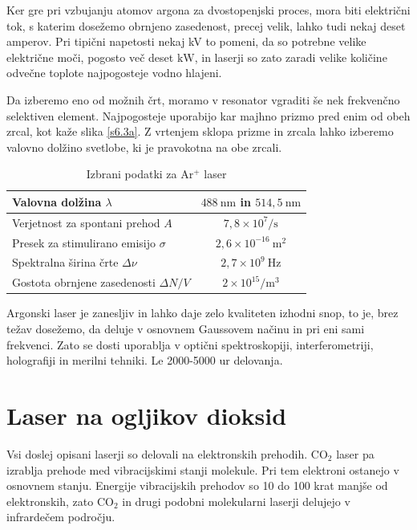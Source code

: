 Ker gre pri vzbujanju atomov argona za dvostopenjski proces, mora biti električni tok, 
s katerim dosežemo obrnjeno zasedenost, precej velik, lahko tudi nekaj deset amperov. 
Pri tipični napetosti nekaj kV to pomeni,
da so potrebne velike električne moči, pogosto več deset $\si{\kilo\watt}$, in 
laserji so zato zaradi velike količine odvečne toplote najpogosteje vodno hlajeni.





Da izberemo eno od možnih črt, moramo v resonator vgraditi še nek
frekvenčno selektiven element. Najpogosteje uporabijo kar majhno prizmo
pred enim od obeh zrcal, kot kaže slika \ref{s6.3a}. Z vrtenjem sklopa
prizme in zrcala lahko izberemo valovno dolžino svetlobe, ki je pravokotna
na obe zrcali.

\begin{table}
\begin{center}
\begin{tabular}{|l|c|}\hline
Valovna dolžina $\lambda$ & $488~\si{\nano\metre}$ in $514,5~\si{\nano\metre}$\\ \hline
Verjetnost za spontani prehod $A$ & $7,8 \times 10^7/\si{\second}$  \\ \hline
Presek za stimulirano emisijo $\sigma$ & $2,6 \times 10^{-16}~\si{\metre}^2$  \\ \hline
Spektralna širina črte $\Delta \nu$ & $2,7 \times 10^{9}~\si{\hertz}$  \\ \hline
Gostota obrnjene zasedenosti $\Delta N/V$ & $2 \times 10^{15}/\si{\metre}^3$ \\ \hline
\end{tabular}
\caption{Izbrani podatki za Ar$^+$ laser}
\label{tab:Ar}
\end{center}
\end{table}


Argonski laser je zanesljiv in lahko daje zelo kvaliteten izhodni snop, to
je, brez težav dosežemo, da deluje v osnovnem Gaussovem načinu in pri eni
sami frekvenci. Zato se dosti uporablja v optični spektroskopiji,
interferometriji, holografiji in merilni tehniki. Le 2000-5000 ur delovanja. 

\section{Laser na ogljikov dioksid}

Vsi doslej opisani laserji so delovali na elektronskih prehodih. CO$_2$
laser pa izrablja prehode med vibracijskimi stanji molekule. Pri tem
elektroni ostanejo v osnovnem stanju. Energije vibracijskih prehodov so 10
do 100 krat manjše od elektronskih, zato CO$_2$ in drugi podobni
molekularni laserji delujejo v infrardečem področju.


